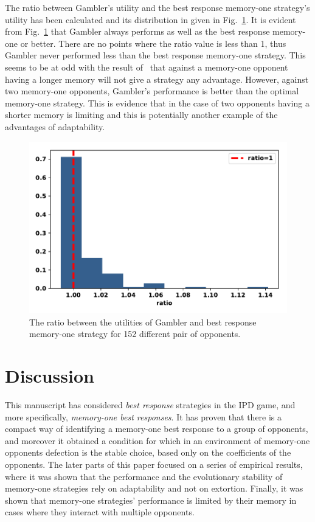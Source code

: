 \documentclass[9pt,twocolumn,twoside,lineno]{pnas-new}
\begin{document}
The ratio between Gambler's utility and the best response memory-one strategy's utility has been calculated and its distribution in
given in Fig.~\ref{fig:utilities_gambler_mem_one}.
It is evident from Fig.~\ref{fig:utilities_gambler_mem_one} that
Gambler always performs as well as the best response memory-one or better. There are
no points where the ratio value is less than 1, thus Gambler never performed less
than the best response memory-one strategy. This seems to be at odd with the
result of~\cite{Press2012} that against a memory-one opponent having a longer memory
will not give a strategy any
advantage. However, against two memory-one opponents, Gambler's performance is better than
the optimal memory-one strategy. This is evidence that in the case of two opponents having a
shorter memory is limiting and this is potentially another example of the advantages
of adaptability.

\begin{figure}[!htbp]
    \centering
    \includegraphics[width=.40\textwidth]{gambler_performance_against_mem_one.pdf}
    \caption{The ratio between the utilities of Gambler and best response memory-one
    strategy for 152 different pair of opponents.}\label{fig:utilities_gambler_mem_one}
\end{figure}

\section*{Discussion}
This manuscript has considered \textit{best response} strategies in the IPD game, and
more specifically, \textit{memory-one best responses}. It has proven that there is
a compact way of identifying a memory-one best response to a group of opponents,
and moreover it obtained a condition for which in an
environment of memory-one opponents defection is the stable choice, based only
on the coefficients of the opponents.
The later parts of this paper focused on a series of empirical results, where it
was shown that the performance and the evolutionary stability of memory-one
strategies rely on adaptability and not on extortion. Finally, it was shown that
memory-one strategies' performance is limited by their memory in cases where
they interact with multiple opponents.
\end{document}
